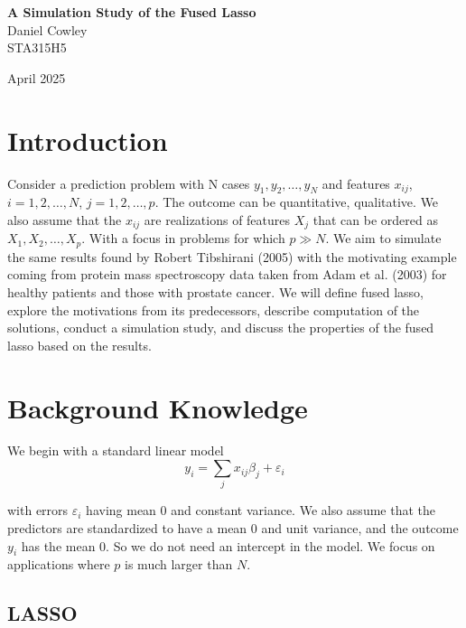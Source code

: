 \documentclass[12pt]{article}
\begin{document}
\begin{center}
\vspace*{3cm}
\textbf{\LARGE A Simulation Study of the Fused Lasso} \\[1.5cm]
Daniel Cowley \\
STA315H5 \\

\vspace{1cm}

April 2025
\end{center}

\vspace{3cm}

\tableofcontents
\newpage

\section{Introduction}

Consider a prediction problem with N cases $y_1, y_2, \dots, y_N$ and features $x_{ij}$, $i = 1, 2, \dots, N$, $j = 1, 2, \dots, p$. The outcome can be quantitative, qualitative. We also assume that the $x_{ij}$ are realizations of features $X_j$ that can be ordered as $X_1, X_2, \dots, X_p$. With a focus in problems for which $p \gg N$. We aim to simulate the same results found by Robert Tibshirani (2005) with the motivating example coming from protein mass spectroscopy data taken from Adam et al. (2003) for healthy patients and those with prostate cancer. We will define fused lasso, explore the motivations from its predecessors, describe computation of the solutions, conduct a simulation study, and discuss the properties of the fused lasso based on the results.

\section{Background Knowledge}

We begin with a standard linear model 
\[y_i = \sum_j x_{ij}\beta_j + \varepsilon_i\]

\noindent with errors $\varepsilon_i$ having mean 0 and constant variance. We also assume that the predictors are standardized to have a mean 0 and unit variance, and the outcome $y_i$ has the mean 0. So we do not need an intercept in the model. We focus on applications where $p$ is much larger than $N$. 

\subsection{LASSO}
\end{document}
